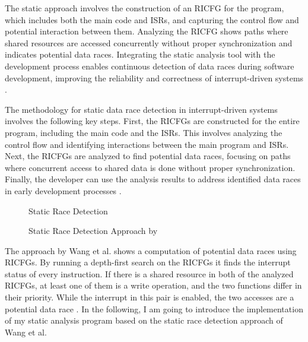 \documentclass[
fancyheadings, %
%
%
]{stsreprt}
\begin{document}
{The static approach involves the construction of an RICFG for the program, which includes both the main code and ISRs, and capturing the control flow and potential interaction between them. Analyzing the RICFG shows paths where shared resources are accessed concurrently without proper synchronization and indicates potential data races. Integrating the static analysis tool with the development process enables continuous detection of data races during software development, improving the reliability and correctness of interrupt-driven systems \cite{wang2020}.

The methodology for static data race detection in interrupt-driven systems involves the following key steps. First, the RICFGs are constructed for the entire program, including the main code and the ISRs. This involves analyzing the control flow and identifying interactions between the main program and ISRs. Next, the RICFGs are analyzed to find potential data races, focusing on paths where concurrent access to shared data is done without proper synchronization. Finally, the developer can use the analysis results to address identified data races in early development processes \cite{wang2020}.

\begin{figure}[H]
	\begin{algorithm}[H]
		\caption{Static Race Detection}
		
		\BlankLine
	\end{algorithm}
	\caption{Static Race Detection Approach by \cite{wang2020}}
\end{figure}

The approach by Wang et al. shows a computation of potential data races using RICFGs. By running a depth-first search on the RICFGs it finds the interrupt status of every instruction. If there is a shared resource in both of the analyzed RICFGs, at least one of them is a write operation, and the two functions differ in their priority. While the interrupt in this pair is enabled, the two accesses are a potential data race \cite{wang2020}.
In the following, I am going to introduce the implementation of my static analysis program based on the static race detection approach of Wang et al.

}
\end{document}

